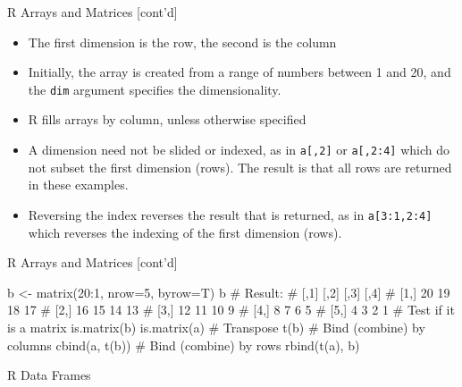 \documentclass[ignorenonframetext,xcolor=x11names]{beamer}
\begin{document}
\begin{frame}{R Arrays and Matrices \small [cont'd]}
\begin{itemize}
   \item The first dimension is the row, the second is the column
   \item Initially, the array is created from a range of numbers between 1 and 20, and the \texttt{dim} argument specifies the dimensionality. 
   \item R fills arrays by column, unless otherwise specified
   \item A dimension need not be slided or indexed, as in \texttt{a[,2]} or \texttt{a[,2:4]} which do not subset the first dimension (rows). The result is that all rows are returned in these examples. 
   \item Reversing the index reverses the result that is returned, as in \texttt{a[3:1,2:4]} which reverses the indexing of the first dimension (rows). 
\end{itemize}
\end{frame}

\begin{frame}[fragile]{R Arrays and Matrices \small [cont'd]}
\begin{Rcode}
b <- matrix(20:1, nrow=5, byrow=T)
b
# Result:
#      [,1] [,2] [,3] [,4]
# [1,]   20   19   18   17
# [2,]   16   15   14   13
# [3,]   12   11   10    9
# [4,]    8    7    6    5
# [5,]    4    3    2    1
# Test if it is a matrix
is.matrix(b)
is.matrix(a)
# Transpose
t(b)
# Bind (combine) by columns
cbind(a, t(b))
# Bind (combine) by rows
rbind(t(a), b)
\end{Rcode}
\end{frame}



\begin{frame}[fragile]{R Data Frames}
\end{frame}
\end{document}
